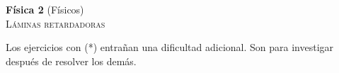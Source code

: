 \documentclass[11pt,spanish,a4paper]{article}
\begin{document}
\begin{center}
	\textbf{Física 2} (Físicos) \hfill {}\\
	\textsc{\LARGE Láminas retardadoras}
\end{center}

Los ejercicios con (*) entrañan una dificultad adicional. Son para investigar después de resolver los demás.


\begin{enumerate}





\end{enumerate}
\end{document}
